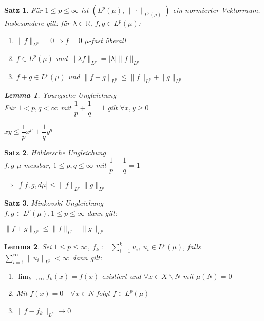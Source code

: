 \documentclass[11pt]{memoir}
\theoremstyle{changebreak}
\newtheorem{Lemma}{Lemma}[chapter]
\newtheorem{Satz}{Satz}[chapter]
\begin{document}
\begin{Satz}
Für $1 \leq p \leq \infty$ ist $(L^p(\mu),\, \|\cdotp\|_{L^p(\mu)})$ ein normierter Vektorraum. Insbesondere gilt: für $\lambda \in \mathbb R$, $f, g \in L^p(\mu)$:
\begin{enumerate}
	\item $\|f\|_{L^p} = 0 \Rightarrow f=0$ $\mu$-fast überall
	\item $f \in L^p(\mu)$ und $\|\lambda f\|_{L^p} = |\lambda|\|f\|_{L^p}$
	\item $f +g \in L^p(\mu)$ und $\|f + g\|_{L^p} \leq \|f\|_{L^p} + \|g\|_{L^p}$
\end{enumerate}

\begin{Lemma}
\emph{Youngsche Ungleichung} \\
Für $1 < p, q < \infty$ mit $\dfrac{1}{p}+\dfrac{1}{q} =1$ gilt $\forall x, y \geq 0$
\begin{center}
	$xy \leq \dfrac{1}{p}x^p + \dfrac{1}{q}y^q$
\end{center}
\end{Lemma}
\end{Satz}

\begin{Satz}
\emph{Höldersche Ungleichung} \\
$f, g$ $\mu$-messbar, $1 \leq p, q \leq \infty$ mit $\dfrac{1}{p}+\dfrac{1}{q} =1$ \\
\begin{center}
	$\Rightarrow \left| \int f, g, d\mu\right| \leq \|f\|_{L^p}\|g\|_{L^p}$
\end{center}
\end{Satz}


\begin{Satz}
\emph{Minkovski-Ungleichung} \\
$f, g \in L^p(\mu), 1 \leq p \leq \infty$ dann gilt:
\begin{center}
	$\|f+g\|_{L^p} \leq \|f\|_{L^p} + \|g\|_{L^p}$
\end{center}
\end{Satz}

\begin{Lemma}
Sei $1 \leq p \leq \infty$, $f_k := \sum\limits_{i=1}^k u_i$, $u_i \in L^p(\mu)$, falls $\sum\limits_{i=1}^\infty \|u_i\|_{L^p} < \infty$ dann gilt:
\begin{enumerate}
	\item $\lim_{k \rightarrow \infty} f_k (x) = f(x)$ existiert und $\forall x \in X\backslash N$ mit $\mu(N) =0$
	\item Mit $f(x) = 0\quad \forall x \in N$ folgt $f \in L^p(\mu)$
	\item $\|f-f_k\|_{L^p} \rightarrow 0$
\end{enumerate}
\end{Lemma}
\end{document}
